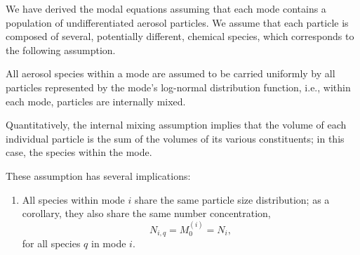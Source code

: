 We have derived the modal equations assuming that each mode contains a
population of undifferentiated aerosol particles. 
We assume that each particle is composed of several, potentially different, chemical species, which corresponds to the following assumption.
%
%
%
%
%
%

\begin{assume}
  All aerosol species within a mode are assumed to be carried uniformly by all particles represented by the mode's log-normal distribution function, i.e., within each mode, particles are internally mixed.
\end{assume}

\begin{assume}
  Quantitatively, the internal mixing assumption implies that the volume of each individual particle is the sum of the volumes of its various constituents; in this case, the species within the mode.  
\end{assume}

These assumption has several implications:
\begin{enumerate}
  \item All species within mode $i$ share the same particle size distribution; as a corollary, they also share the same number concentration,
  \begin{equation}
    N_{i,q} = M_0^{(i)} = N_i,
  \end{equation}
  for all species $q$ in mode $i$.
\end{enumerate}

